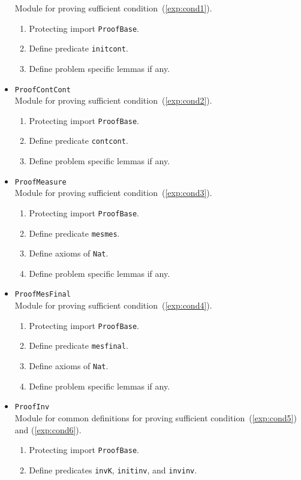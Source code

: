 \documentclass[12pt]{report}
\begin{document}
\begin{itemize}
  Module for proving sufficient condition~(\ref{exp:cond1}).
  \begin{enumerate}
  \item Protecting import {\tt ProofBase}.
  \item Define predicate {\tt initcont}.
  \item Define problem specific lemmas if any.
  \end{enumerate}
\item {\tt ProofContCont}\\
  Module for proving sufficient condition~(\ref{exp:cond2}).
  \begin{enumerate}
  \item Protecting import {\tt ProofBase}.
  \item Define predicate {\tt contcont}.
  \item Define problem specific lemmas if any.
  \end{enumerate}
\item {\tt ProofMeasure}\\
  Module for proving sufficient condition~(\ref{exp:cond3}).
  \begin{enumerate}
  \item Protecting import {\tt ProofBase}.
  \item Define predicate {\tt mesmes}.
  \item Define axioms of {\tt Nat}.
  \item Define problem specific lemmas if any.
  \end{enumerate}
\item {\tt ProofMesFinal}\\
  Module for proving sufficient condition~(\ref{exp:cond4}).
  \begin{enumerate}
  \item Protecting import {\tt ProofBase}.
  \item Define predicate {\tt mesfinal}.
  \item Define axioms of {\tt Nat}.
  \item Define problem specific lemmas if any.
  \end{enumerate}
\item {\tt ProofInv}\\
  Module for common definitions for proving sufficient
  condition~(\ref{exp:cond5}) and (\ref{exp:cond6}).
  \begin{enumerate}
  \item Protecting import {\tt ProofBase}.
  \item Define predicates {\tt invK}, {\tt initinv}, and {\tt invinv}.

\end{enumerate}
\end{itemize}
\end{document}
